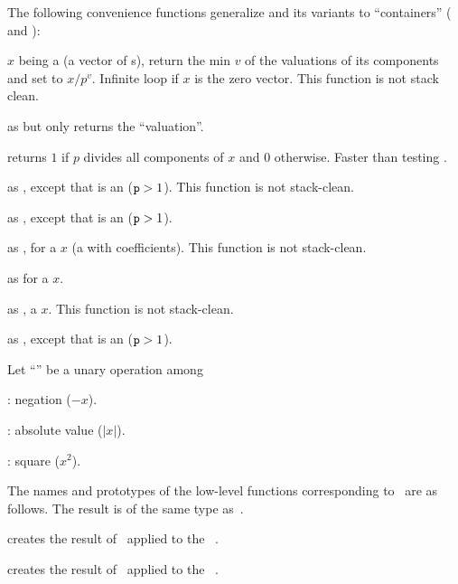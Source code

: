 The following convenience functions generalize  and its variants
to ``containers'' ( and ):


 $x$ being a  (a vector
of s), return the min $v$ of the valuations of its components and
set  to $x/p^v$. Infinite loop if $x$ is the zero vector.
This function is not stack clean.

 as  but only returns the
``valuation''.

 returns $1$ if $p$ divides all components
of $x$ and $0$ otherwise. Faster than testing .

 as ,
except that  is an  (${\tt p} > 1$).
This function is not stack-clean.

 as ,
except that  is an  (${\tt p} > 1$).


 as , for
a  $x$ (a  with  coefficients).
This function is not stack-clean.

 as  for a  $x$.

 as ,
a  $x$.
This function is not stack-clean.

 as ,
except that  is an  (${\tt p} > 1$).

 Let ``\op'' be a unary operation among

\item {}: negation ($-x$).

\item {}: absolute value ($|x|$).

\item {}: square ($x^2$).

\noindent The names and prototypes of the low-level functions corresponding
to \op\ are as follows. The result is of the same type as~.

 creates the result of \op\ applied to the
~.

 creates the result of \op\ applied to the
~.


